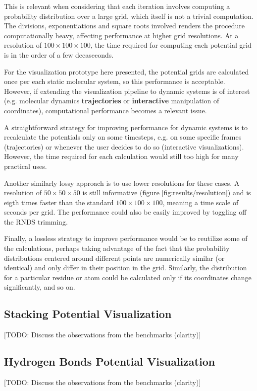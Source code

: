     This is relevant when considering that each iteration involves computing a probability distribution over a large grid, which itself is not a trivial computation. The divisions, exponentiations and square roots involved renders the procedure computationally heavy, affecting performance at higher grid resolutions. At a resolution of $100 \times 100 \times 100$, the time required for computing each potential grid is in the order of a few decaseconds.

    For the visualization prototype here presented, the potential grids are calculated once per each static molecular system, so this performance is acceptable. However, if extending the visualization pipeline to dynamic systems is of interest (e.g. molecular dynamics \textbf{trajectories} or \textbf{interactive} manipulation of coordinates), computational performance becomes a relevant issue.

    A straightforward strategy for improving performance for dynamic systems is to recalculate the potentials only on some timesteps, e.g. on some specific frames (trajectories) or whenever the user decides to do so (interactive visualizations). However, the time required for each calculation would still too high for many practical uses.

    Another similarly lossy approach is to use lower resolutions for these cases. A resolution of $50 \times 50 \times 50$ is still informative (figure \ref{fig:results/resolution}) and is eigth times faster than the standard $100 \times 100 \times 100$, meaning a time scale of seconds per grid. The performance could also be easily improved by toggling off the RNDS trimming.

    Finally, a lossless strategy to improve performance would be to reutilize some of the calculations, perhaps taking advantage of the fact that the probability distributions centered around different points are numerically similar (or identical) and only differ in their position in the grid. Similarly, the distribution for a particular residue or atom could be calculated only if its coordinates change significantly, and so on.

  \subsection{Stacking Potential Visualization}
    [TODO: Discuss the observations from the benchmarks (clarity)]

  \subsection{Hydrogen Bonds Potential Visualization}
    [TODO: Discuss the observations from the benchmarks (clarity)]

